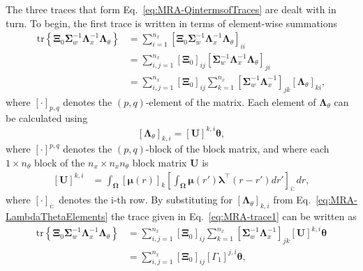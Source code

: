 \documentclass[review,authoryear,3p]{elsarticle}
\begin{document}
The three traces that form Eq.~\eqref{eq:MRA-QintermsofTraces} are dealt with in turn. To begin, the first trace is written in terms of element-wise summations
\begin{align}\label{eq:MRA-trace1}
\mathrm{tr} \left\lbrace \boldsymbol \Xi_0\boldsymbol\Sigma_w^{-1}\boldsymbol\Lambda_x^{-1}\boldsymbol\Lambda_{\theta}\right\rbrace&=\sum_{i=1}^{n_x}\left[ \boldsymbol \Xi_0\boldsymbol\Sigma_w^{-1}\boldsymbol\Lambda_x^{-1}\boldsymbol\Lambda_{\theta}\right]_{ii} \nonumber \\
&=\sum_{i,j=1}^{n_x}\left[ \boldsymbol\Xi_0\right]_{ij}\left[\boldsymbol\Sigma_w^{-1}\boldsymbol\Lambda_x^{-1}  \boldsymbol\Lambda_{\theta}\right]_{ji}\nonumber\\
&=\sum_{i,j=1}^{n_x}\left[ \boldsymbol\Xi_0\right]_{ij}\sum_{k=1}^{n_x}\left[\boldsymbol\Sigma_w^{-1}\boldsymbol\Lambda_x^{-1} \right]_{jk} \left[ \boldsymbol\Lambda_{\theta}\right]_{ki},
\end{align}
where $[\cdot]_{p,q}$ denotes the $\left(p,q\right)$-element of the matrix. Each element of $\boldsymbol\Lambda_{\theta}$ can be calculated using
\begin{equation}\label{eq:MRA-LambdaThetaElements}
\left[ \boldsymbol\Lambda_{\theta}\right] _{k,i}=\left[ \mathbf U\right]^{k,i}\boldsymbol\theta,
\end{equation}
where $ [\cdot]^{p,q}$ denotes the $\left(p,q\right)$-block of the block matrix, and where
each $ 1 \times n_{\theta}$ block of the $n_x \times n_x n_{\theta}$ block matrix $\mathbf U$ is 
\begin{align}\label{eq:Uij}
\left[ \mathbf U\right] ^{k,i}&=\int_{\boldsymbol \Omega}\left[\boldsymbol\mu(r) \right]_k \left[\int_{\boldsymbol\Omega} \boldsymbol\mu\left(r'\right)\boldsymbol \lambda^\top \left(r-r'\right) dr'\right]_{i:} dr,
\end{align}
where $[\cdot]_{i:} $ denotes the i-th row.  By substituting for $\left[ \boldsymbol\Lambda_{\theta}\right] _{k,i}$ from Eq.~\eqref{eq:MRA-LambdaThetaElements} the trace given in Eq.~\eqref{eq:MRA-trace1} can be written as
\begin{align}
\mathrm{tr} \left\lbrace \boldsymbol \Xi_0\boldsymbol\Sigma_w^{-1}\boldsymbol\Lambda_x^{-1}\boldsymbol\Lambda_{\theta}\right\rbrace&=\sum_{i,j=1}^{n_x}\left[ \boldsymbol\Xi_0\right]_{ij}\sum_{k=1}^{n_x}\left[ \boldsymbol\Sigma_w^{-1}\boldsymbol\Lambda_x^{-1}\right]_{jk} \left[ \mathbf U\right]^{k,i}\boldsymbol\theta \nonumber \\
&=\sum_{i,j=1}^{n_x}\left[ \boldsymbol\Xi_0\right]_{ij}\left[ \Gamma_1\right] ^{j,i}\boldsymbol\theta,
\end{align}
\end{document}
